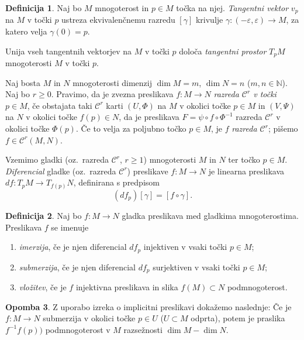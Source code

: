 \documentclass[12pt,a4paper,twoside]{article}
\theoremstyle{definition} %
\newtheorem{definicija}{Definicija}[section]
\newtheorem{opomba}[definicija]{Opomba}
\theoremstyle{plain} %
\numberwithin{equation}{section}  %
\newcommand{\N}{\mathbb N}
\begin{document}
\begin{definicija}
Naj bo $M$ mnogoterost in $p \in M$ točka na njej. \emph{Tangentni vektor} $v_{p}$ na $M$ v točki $p$ ustreza ekvivalenčnemu razredu $[\gamma]$ krivulje $\gamma \colon (-\varepsilon, \varepsilon) \to M$, za katero velja $\gamma (0) = p$.

Unija vseh tangentnih vektorjev na $M$ v točki $p$ določa \emph{tangentni prostor} $T_{p}M$ mnogoterosti $M$ v točki $p$.
\end{definicija}

Naj bosta $M$ in $N$ mnogoterosti dimenzij $\dim M = m$, $\dim N = n$ ($m, n \in \N$). Naj bo $r \geq 0$. Pravimo, da je zvezna preslikava $f \colon M \to N$ \emph{razreda $\mathcal{C}^{r}$ v točki} $p \in M$, če obstajata taki $\mathcal{C}^{r}$ karti $(U, \Phi)$ na $M$ v okolici točke $p \in M$ in $(V, \Psi)$ na $N$ v okolici točke $f(p) \in N$, da je preslikava $F = \psi \circ f \circ \Phi^{-1}$ razreda $\mathcal{C}^{r}$ v okolici točke $\Phi(p)$.
Če to velja za poljubno točko $p \in M$, je $f$ \emph{razreda $\mathcal{C}^{r}$}; pišemo $f \in  \mathcal{C}^{r}(M,N)$.

Vzemimo gladki (oz.~razreda $\mathcal{C}^{r}$, $r \geq 1$) mnogoterosti $M$ in $N$ ter točko $p \in M$. \emph{Diferencial} gladke (oz.~razreda $\mathcal{C}^{r}$) preslikave $f \colon M \to N$ je linearna preslikava $df \colon T_{p}M \to T_{f(p)}N$, definirana s predpisom
\[ (df_{p})[\gamma] = [f \circ \gamma]. \]

\begin{definicija}
Naj bo $f \colon M \to N$ gladka preslikava med gladkima mnogoterostima. Preslikava $f$ se imenuje 
\begin{enumerate}
\item \emph{imerzija}, če je njen diferencial $df_{p}$ injektiven v vsaki točki $p \in M$;
\item \emph{submerzija}, če je njen diferencial $df_{p}$ surjektiven v vsaki točki $p \in M$;
\item \emph{vložitev}, če je $f$ injektivna preslikava in slika $f(M) \subset N$ podmnogoterost.
\end{enumerate}
\end{definicija}

\begin{opomba}
Z uporabo izreka o implicitni preslikavi dokažemo naslednje: Če je $f \colon M \to N$ submerzija v okolici točke $p \in U$ ($U \subset M$ odprta), potem je praslika $f^{-1}f(p))$ podmnogoterost v $M$ razsežnosti $\dim M - \dim N$.
\end{opomba}
\end{document}
